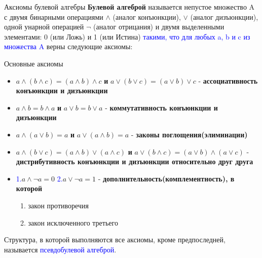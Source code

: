 \documentclass[aspectratio=169]{beamer}
\newcommand{\blu}{\textcolor{blue}}
\begin{document}
\begin{frame}[shrink=24]{Аксиомы булевой алгебры}
\textbf{Булевой алгеброй} называется непустое множество A с двумя бинарными операциями $\wedge$ (аналог конъюнкции), $\vee$ (аналог дизъюнкции), одной унарной операцией $\neg$  (аналог отрицания) и двумя выделенными элементами: 0 (или Ложь) и 1 (или Истина) \blu{такими, что для любых a, b и c из множества A} верны следующие аксиомы:
\begin{alertblock}{Основные аксиомы}
\begin{itemize}
\setlength\itemsep{2mm}
    \item $a\wedge (b\wedge c) = (a\wedge b)\wedge c$ \textbf{и} $a\vee (b\vee c) = (a\vee b)\vee c$ -  \textbf{ассоциативность конъюнкции и дизъюнкции}
    \item $a\wedge b=b\wedge a$ \textbf{и}  $a\vee b=b\vee a$ - \textbf{коммутативность конъюнкции и дизъюнкции}
    \item $a\wedge (a\vee b) = a$ \textbf{и} $a\vee (a\wedge b) = a$ - \textbf{законы поглощения(элиминации)}
    \item $a\wedge (b\vee c) = (a\wedge b)\vee (a\wedge c)$ \textbf{и} $a\vee (b\wedge c) = (a\vee b)\wedge (a\vee c)$ - \textbf{дистрибутивность конъюнкции и дизъюнкции относительно друг друга}
    \item \blu{1.}$a\wedge \neg a=0$ \blu{2.}$a\vee \neg a=1$ - \textbf{дополнительность(комплементность), в которой} \scriptsize \begin{enumerate}
        \item закон противоречия
        \item закон исключенного третьего
    \end{enumerate}
\end{itemize}
\end{alertblock}

     Структура, в которой выполняются все аксиомы, кроме предпоследней, называется \blu{псевдобулевой алгеброй}.
\end{frame}
\end{document}
